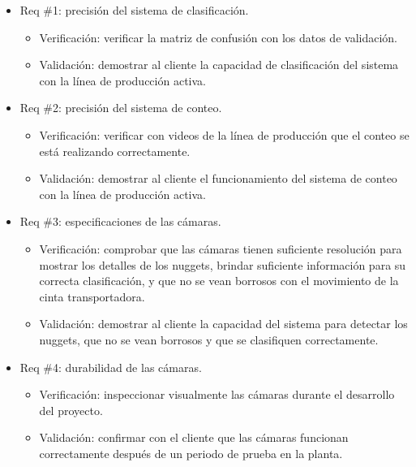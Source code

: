 \documentclass[
11pt, %
]{charter}
\begin{document}
\begin{itemize} 
\item Req \#1: precisión del sistema de clasificación.
	\begin{itemize}
	\item Verificación: verificar la matriz de confusión con los datos de validación.
	\item Validación: demostrar al cliente la capacidad de clasificación del sistema con la línea de producción activa.
	\end{itemize}
\end{itemize}

\begin{itemize} 
\item Req \#2: precisión del sistema de conteo.
	\begin{itemize}
	\item Verificación: verificar con videos de la línea de producción que el conteo se está realizando correctamente.
	\item Validación: demostrar al cliente el funcionamiento del sistema de conteo con la línea de producción activa.
	\end{itemize}
\end{itemize}

\begin{itemize} 
\item Req \#3: especificaciones de las cámaras.
	\begin{itemize}
	\item Verificación: comprobar que las cámaras tienen suficiente resolución para mostrar los detalles de los nuggets, brindar suficiente información para su correcta clasificación, y que no se vean borrosos con el movimiento de la cinta transportadora.
	\item Validación: demostrar al cliente la capacidad del sistema para detectar los nuggets, que no se vean borrosos y que se clasifiquen correctamente.
	\end{itemize}
\end{itemize}

\begin{itemize} 
\item Req \#4: durabilidad de las cámaras.
	\begin{itemize}
	\item Verificación: inspeccionar visualmente las cámaras durante el desarrollo del proyecto.
	\item Validación: confirmar con el cliente que las cámaras funcionan correctamente después de un periodo de prueba en la planta.
	\end{itemize}
\end{itemize}
\end{document}
